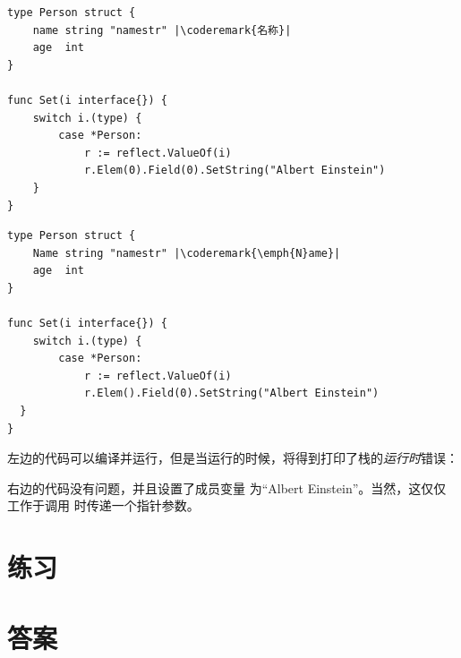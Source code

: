 \begin{minipage}{.5\textwidth}
\begin{lstlisting}[caption=私有成员的反射]
type Person struct {
    name string "namestr" |\coderemark{名称}|
    age  int
}

func Set(i interface{}) {
    switch i.(type) {
        case *Person:
            r := reflect.ValueOf(i)
            r.Elem(0).Field(0).SetString("Albert Einstein")
    }
}
\end{lstlisting}
\end{minipage}
\hspace{2em}
\begin{minipage}{.5\textwidth}
\begin{lstlisting}[caption=公有成员的反射]
type Person struct {
    Name string "namestr" |\coderemark{\emph{N}ame}|
    age  int
}

func Set(i interface{}) {
    switch i.(type) {
        case *Person:
            r := reflect.ValueOf(i)
            r.Elem().Field(0).SetString("Albert Einstein")
  }
}
\end{lstlisting}
\end{minipage}
左边的代码可以编译并运行，但是当运行的时候，将得到打印了栈的\emph{运行时}错误：

\noindent{}

\noindent{}右边的代码没有问题，并且设置了成员变量  
为``Albert Einstein''。当然，这仅仅工作于调用  时传递一个指针参数。

\section{练习}






\cleardoublepage
\section{答案}
\shipoutAnswer
